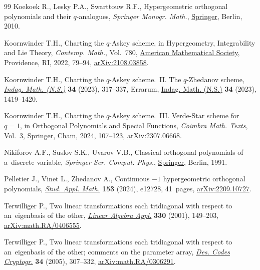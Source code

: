 \begin{thebibliography}{99}
Koekoek R., Lesky P.A., Swarttouw R.F., Hypergeometric orthogonal polynomials
 and their {$q$}-analogues, \textit{Springer Monogr. Math.},
 \href{https://doi.org/10.1007/978-3-642-05014-5}{Springer}, Berlin, 2010.

Koornwinder T.H., Charting the {$q$}-{A}skey scheme, in Hypergeometry,
 Integrability and {L}ie Theory, \textit{Contemp. Math.}, Vol.~780,
 \href{https://doi.org/10.1090/conm/780/15688}{American Mathematical Society},
 Providence, RI, 2022, 79--94,
 \href{http://arxiv.org/abs/2108.03858}{arXiv:2108.03858}.

Koornwinder T.H., Charting the {$q$}-{A}skey scheme.~{II}. {T}he
 {$q$}-{Z}hedanov scheme,
 \href{https://doi.org/10.1016/j.indag.2022.12.003}{\textit{Indag. Math.
 (N.S.)}} \textbf{34} (2023), 317--337, {E}rrarum,
 \href{https://doi.org/10.1016/j.indag.2023.05.006}{Indag. Math. (N.S.)}
 \textbf{34} (2023), 1419--1420.

Koornwinder T.H., Charting the {$q$}-{A}skey scheme.~{III}. Verde-Star scheme
 for $q=1$, in Orthogonal Polynomials and Special Functions, \textit{Coimbra Math. Texts}, Vol.~3, 
 \href{https://doi.org/10.1007/978-3-031-69646-6_5}{Springer}, Cham, 2024, 107--123,
 \href{http://arxiv.org/abs/2307.06668}{arXiv:2307.06668}.

Nikiforov A.F., Suslov S.K., Uvarov V.B., Classical orthogonal polynomials of
 a~discrete variable, \textit{Springer Ser. Comput. Phys.},
 \href{https://doi.org/10.1007/978-3-642-74748-9}{Springer}, Berlin, 1991.

Pelletier J., Vinet L., Zhedanov A., Continuous {$-1$} hypergeometric
 orthogonal polynomials,
 \href{https://doi.org/0.1111/sapm.12728}{\textit{Stud. Appl. Math.}}
 \textbf{153} (2024), e12728, 41~pages,
 \href{http://arxiv.org/abs/2209.10727}{arXiv:2209.10727}.

Terwilliger P., Two linear transformations each tridiagonal with respect to
 an~eigenbasis of the other,
 \href{https://doi.org/10.1016/S0024-3795(01)00242-7}{\textit{Linear Algebra
 Appl.}} \textbf{330} (2001), 149--203,
 \href{http://arxiv.org/abs/math.RA/0406555}{arXiv:math.RA/0406555}.

Terwilliger P., Two linear transformations each tridiagonal with respect to
 an~eigenbasis of the other; comments on the parameter array,
 \href{https://doi.org/10.1007/s10623-004-4862-7}{\textit{Des. Codes
 Cryptogr.}} \textbf{34} (2005), 307--332,
 \href{http://arxiv.org/abs/math.RA/0306291}{arXiv:math.RA/0306291}.


\end{thebibliography}
